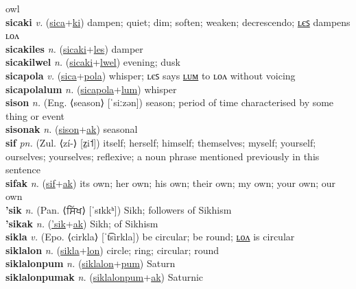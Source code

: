 owl \label{sicalwelkiah} \\
\textbf{sicaki} \textit{v.} (\hyperref[sica]{sica}+\hyperref[ki]{ki})
dampen; quiet; dim; soften; weaken; decrescendo; \hyperref[sicakiles]{ʟєꜱ} dampens ʟᴏᴧ \label{sicaki} \\
\textbf{sicakiles} \textit{n.} (\hyperref[sicaki]{sicaki}+\hyperref[les]{les})
damper \label{sicakiles} \\
\textbf{sicakilwel} \textit{n.} (\hyperref[sicaki]{sicaki}+\hyperref[lwel]{lwel})
evening; dusk \label{sicakilwel} \\
\textbf{sicapola} \textit{v.} (\hyperref[sica]{sica}+\hyperref[pola]{pola})
whisper; ʟєꜱ says \hyperref[sicapolalum]{ʟᴜᴍ} to ʟᴏᴧ without voicing \label{sicapola} \\
\textbf{sicapolalum} \textit{n.} (\hyperref[sicapola]{sicapola}+\hyperref[lum]{lum})
whisper \label{sicapolalum} \\
\textbf{sison} \textit{n.} (Eng. ⟨season⟩ [ˈsiːzən])
season; period of time characterised by some thing or event \label{sison} \\
\textbf{sisonak} \textit{n.} (\hyperref[sison]{sison}+\hyperref[ak]{ak})
seasonal \label{sisonak} \\
\textbf{sif} \textit{pn.} (Zul. ⟨zí-⟩ [z̤i˦])
itself; herself; himself; themselves; myself; yourself; ourselves; yourselves; reflexive; a noun phrase mentioned previously in this sentence \label{sif} \\
\textbf{sifak} \textit{n.} (\hyperref[sif]{sif}+\hyperref[ak]{ak})
its own; her own; his own; their own; my own; your own; our own \label{sifak} \\
\textbf{'sik} \textit{n.} (Pan. ⟨ਸਿੱਖ⟩ [ˈsɪkkʰ])
Sikh; followers of Sikhism \label{'sik} \\
\textbf{'sikak} \textit{n.} (\hyperref['sik]{'sik}+\hyperref[ak]{ak})
Sikh; of Sikhism \label{'sikak} \\
\textbf{sikla} \textit{v.} (Epo. ⟨cirkla⟩ [ˈt͡sirkla])
be circular; be round; \hyperref[siklalon]{ʟᴏᴧ} is circular \label{sikla} \\
\textbf{siklalon} \textit{n.} (\hyperref[sikla]{sikla}+\hyperref[lon]{lon})
circle; ring; circular; round \label{siklalon} \\
\textbf{siklalonpum} \textit{n.} (\hyperref[siklalon]{siklalon}+\hyperref[pum]{pum})
Saturn \label{siklalonpum} \\
\textbf{siklalonpumak} \textit{n.} (\hyperref[siklalonpum]{siklalonpum}+\hyperref[ak]{ak})
Saturnic \label{siklalonpumak} \\
